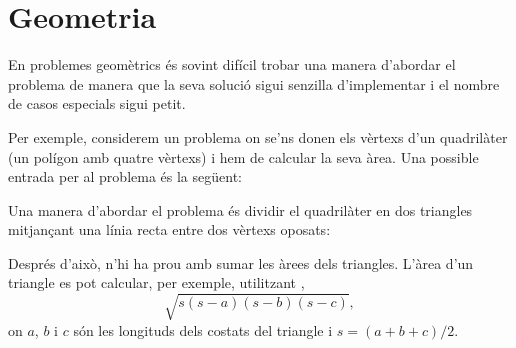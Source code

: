 \chapter{Geometria}


En problemes geomètrics és sovint difícil trobar una manera d'abordar
el problema de manera que la seva solució sigui senzilla d'implementar
i el nombre de casos especials sigui petit.

Per exemple, considerem un problema on se'ns donen els vèrtexs d'un
quadrilàter (un polígon amb quatre vèrtexs) i hem de calcular la seva
àrea. Una possible entrada per al problema és la següent:


\begin{center}
\end{center}
Una manera d'abordar el problema és dividir el quadrilàter en dos
triangles mitjançant una línia recta entre dos vèrtexs oposats:
\begin{center}
\end{center}
Després d'això, n'hi ha prou amb sumar les àrees dels
triangles. L'àrea d'un triangle es pot calcular, per exemple,
utilitzant ,
\[ \sqrt{s (s-a) (s-b) (s-c)},\]
on $a$, $b$ i $c$ són les longituds dels costats del triangle i
$s=(a+b+c)/2$. 

